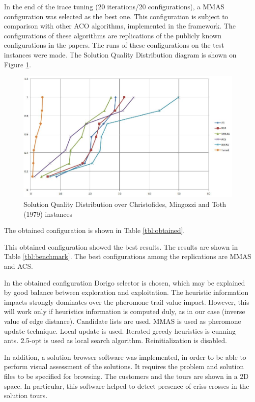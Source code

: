 \documentclass[12pt,a4paper,oneside]{book}
\begin{document}
In the end of the irace tuning (20 iterations/20 configurations), a MMAS configuration was selected as the best one. This configuration is subject to comparison with other ACO algorithms, implemented in the framework. The configurations of these algorithms are replications of the publicly known configurations in the papers. The runs of these configurations on the test instances were made. The Solution Quality Distribution diagram is shown on Figure \ref{fig:sqd-cmt}.

\begin{figure}[h]
  \centering
    \includegraphics[scale=0.65]{sqd-benchmark.jpg}
  \caption{Solution Quality Distribution over Christofides, Mingozzi and Toth (1979) instances}
  \label{fig:sqd-cmt}
\end{figure}

The obtained configuration is shown in Table \ref{tbl:obtained}.

This obtained configuration showed the best results. The results are shown in Table \ref{tbl:benchmark}. The best configurations among the replications are MMAS and ACS.

In the obtained configuration Dorigo selector is chosen, which may be explained by good balance between exploration and exploitation. The heuristic information impacts strongly dominates over the pheromone trail value impact. However, this will work only if heuristics information is computed duly, as in our case (inverse value of edge distance). Candidate lists are used. MMAS is used as pheromone update technique. Local update is used. Iterated greedy heuristics is cunning ants. 2.5-opt is used as local search algorithm. Reinitialization is disabled.

In addition, a solution browser software was implemented, in order to be able to perform visual assessment of the solutions. It requires the problem and solution files to be specified for browsing. The customers and the tours are shown in a 2D space. In particular, this software helped to detect presence of criss-crosses in the solution tours.
\end{document}
